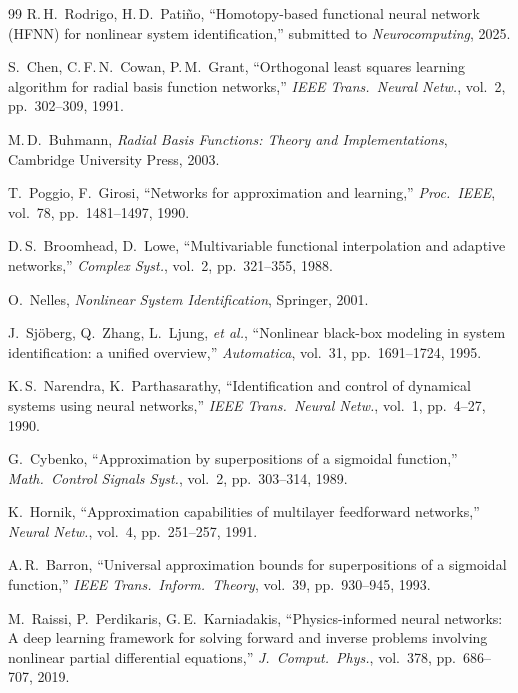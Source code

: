 \documentclass[11pt,a4paper]{article}
\begin{document}
\begin{thebibliography}{99}
R.\,H.\ Rodrigo, H.\,D.\ Pati\~no, ``Homotopy-based functional neural network (HFNN) for nonlinear system identification,'' submitted to \textit{Neurocomputing}, 2025.

S.\ Chen, C.\,F.\,N.\ Cowan, P.\,M.\ Grant, ``Orthogonal least squares learning algorithm for radial basis function networks,'' \textit{IEEE Trans.\ Neural Netw.}, vol.~2, pp.~302--309, 1991.

M.\,D.\ Buhmann, \textit{Radial Basis Functions: Theory and Implementations}, Cambridge University Press, 2003.

T.\ Poggio, F.\ Girosi, ``Networks for approximation and learning,'' \textit{Proc.\ IEEE}, vol.~78, pp.~1481--1497, 1990.

D.\,S.\ Broomhead, D.\ Lowe, ``Multivariable functional interpolation and adaptive networks,'' \textit{Complex Syst.}, vol.~2, pp.~321--355, 1988.

O.\ Nelles, \textit{Nonlinear System Identification}, Springer, 2001.

J.\ Sj\"oberg, Q.\ Zhang, L.\ Ljung, \textit{et al.}, ``Nonlinear black-box modeling in system identification: a unified overview,'' \textit{Automatica}, vol.~31, pp.~1691--1724, 1995.

K.\,S.\ Narendra, K.\ Parthasarathy, ``Identification and control of dynamical systems using neural networks,'' \textit{IEEE Trans.\ Neural Netw.}, vol.~1, pp.~4--27, 1990.

G.\ Cybenko, ``Approximation by superpositions of a sigmoidal function,'' \textit{Math.\ Control Signals Syst.}, vol.~2, pp.~303--314, 1989.

K.\ Hornik, ``Approximation capabilities of multilayer feedforward networks,'' \textit{Neural Netw.}, vol.~4, pp.~251--257, 1991.

A.\,R.\ Barron, ``Universal approximation bounds for superpositions of a sigmoidal function,'' \textit{IEEE Trans.\ Inform.\ Theory}, vol.~39, pp.~930--945, 1993.

M.\ Raissi, P.\ Perdikaris, G.\,E.\ Karniadakis, ``Physics-informed neural networks: A deep learning framework for solving forward and inverse problems involving nonlinear partial differential equations,'' \textit{J.\ Comput.\ Phys.}, vol.~378, pp.~686--707, 2019.

\end{thebibliography}
\end{document}
